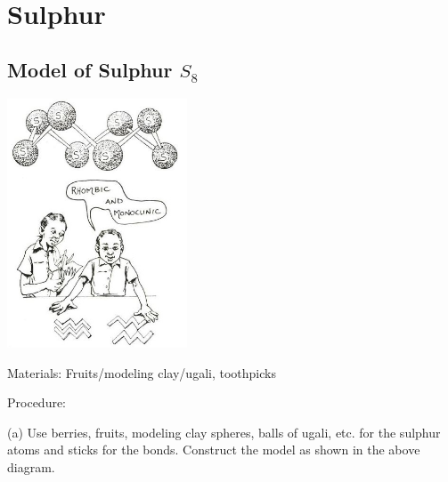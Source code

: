 \begin{multicols}{2}
\begin{description*}
{\\
}
\end{description*}


\section*{Sulphur} 


\subsection{Model of Sulphur $S_8$}

\begin{center}
\includegraphics[width=0.4\textwidth]{./img/source/sulphur-model.jpg}
\end{center}

\begin{description*}
\item[Materials:]{Fruits/modeling clay/ugali, toothpicks}
\item[Procedure:]{(a) Use berries, fruits, modeling
clay spheres, balls of ugali, etc. for the sulphur atoms and
sticks for the bonds. Construct the model as
shown in the above diagram.

}
\end{description*}
\end{multicols}

